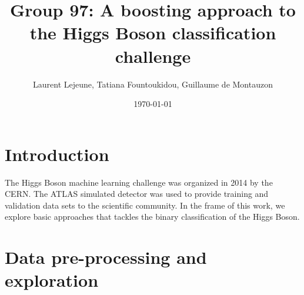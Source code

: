 \documentclass[10pt,conference,compsocconf]{IEEEtran}
\author{Laurent Lejeune, Tatiana Fountoukidou, Guillaume de Montauzon}
\date{\today}
\title{Group 97: A boosting approach to the Higgs Boson classification challenge}
\begin{document}
\maketitle
\section{Introduction}
\label{sec:orgheadline1}
The Higgs Boson machine learning challenge was organized in 2014 by the CERN. The ATLAS simulated detector was used to provide training and validation data sets to the scientific community. In the frame of this work, we explore basic approaches that tackles the binary classification of the Higgs Boson.
\section{Data pre-processing and exploration}
\label{sec:orgheadline7}
\end{document}
